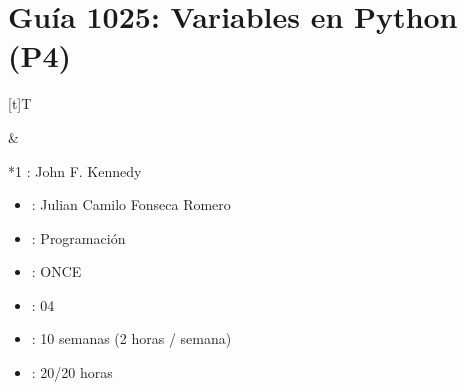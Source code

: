 \documentclass[letterpaper,10pt,spanish]{sphinxmanual}
\begin{document}
\sphinxstepscope


\section{Guía 1025: Variables en Python (P4)}
\label{\detokenize{1_guias/10programacion/G1025:guia-1025-variables-en-python-p4}}\label{\detokenize{1_guias/10programacion/G1025::doc}}

\begin{savenotes}\sphinxattablestart
\sphinxthistablewithglobalstyle
\centering
\begin{tabular}[t]{}
\sphinxtoprule
\sphinxtableatstartofbodyhook

\begin{savenotes}\sphinxattablestart
\sphinxthistablewithglobalstyle
\centering
\begin{tabulary}{\linewidth}[t]{T}
\sphinxtoprule
\sphinxtableatstartofbodyhook
\sphinxAtStartPar
{}
\\
\sphinxbottomrule
\end{tabulary}
\sphinxtableafterendhook\par
\sphinxattableend\end{savenotes}
&

\begin{savenotes}\sphinxattablestart
\sphinxthistablewithglobalstyle
\raggedright
\begin{tabular}[t]{*{1}{}}
\sphinxtoprule
\sphinxtableatstartofbodyhook
\sphinxAtStartPar
{}: John F. Kennedy
\begin{itemize}
\item {} 
\sphinxAtStartPar
{}: Julian Camilo Fonseca Romero

\item {} 
\sphinxAtStartPar
{}: Programación

\item {} 
\sphinxAtStartPar
{}: ONCE

\item {} 
\sphinxAtStartPar
{}: 04

\item {} 
\sphinxAtStartPar
{}: 10 semanas (2 horas / semana)

\item {} 
\sphinxAtStartPar
{}: 20/20 horas

\end{itemize}
\\
\sphinxbottomrule
\end{tabular}
\sphinxtableafterendhook\par
\sphinxattableend\end{savenotes}
\\
\sphinxbottomrule
\end{tabular}
\sphinxtableafterendhook\par
\sphinxattableend\end{savenotes}
\end{document}
